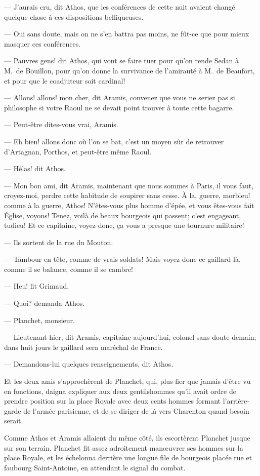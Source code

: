 — J'aurais cru, dit Athos, que les conférences de cette nuit avaient changé quelque chose à ces dispositions belliqueuses.

— Oui sans doute, mais on ne s'en battra pas moins, ne fût-ce que pour mieux masquer ces conférences.

— Pauvres gens! dit Athos, qui vont se faire tuer pour qu'on rende Sedan à M.~de Bouillon, pour qu'on donne la survivance de l'amirauté à M.~de Beaufort, et pour que le coadjuteur soit cardinal!

— Allons! allons! mon cher, dit Aramis, convenez que vous ne seriez pas si philosophe si votre Raoul ne se devait point trouver à toute cette bagarre.

— Peut-être dites-vous vrai, Aramis.

— Eh bien! allons donc où l'on se bat, c'est un moyen sûr de retrouver d'Artagnan, Porthos, et peut-être même Raoul.

— Hélas! dit Athos.

— Mon bon ami, dit Aramis, maintenant que nous sommes à Paris, il vous faut, croyez-moi, perdre cette habitude de soupirer sans cesse. À la, guerre, morbleu! comme à la guerre, Athos! N'êtes-vous plus homme d'épée, et vous êtes-vous fait Église, voyons! Tenez, voilà de beaux bourgeois qui passent; c'est engageant, tudieu! Et ce capitaine, voyez donc, ça vous a presque une tournure militaire!

— Ils sortent de la rue du Mouton.

— Tambour en tête, comme de vrais soldats! Mais voyez donc ce gaillard-là, comme il se balance, comme il se cambre!

— Heu! fit Grimaud.

— Quoi? demanda Athos.

— Planchet, monsieur.

— Lieutenant hier, dit Aramis, capitaine aujourd'hui, colonel sans doute demain; dans huit jours le gaillard sera maréchal de France.

— Demandons-lui quelques renseignements, dit Athos.

Et les deux amis s'approchèrent de Planchet, qui, plus fier que jamais d'être vu en fonctions, daigna expliquer aux deux gentilshommes qu'il avait ordre de prendre position sur la place Royale avec deux cents hommes formant l'arrière-garde de l'armée parisienne, et de se diriger de là vers Charenton quand besoin serait.

Comme Athos et Aramis allaient du même côté, ils escortèrent Planchet jusque sur son terrain.
Planchet fit assez adroitement manœuvrer ses hommes sur la place Royale, et les échelonna derrière une longue file de bourgeois placée rue et faubourg Saint-Antoine, en attendant le signal du combat.

